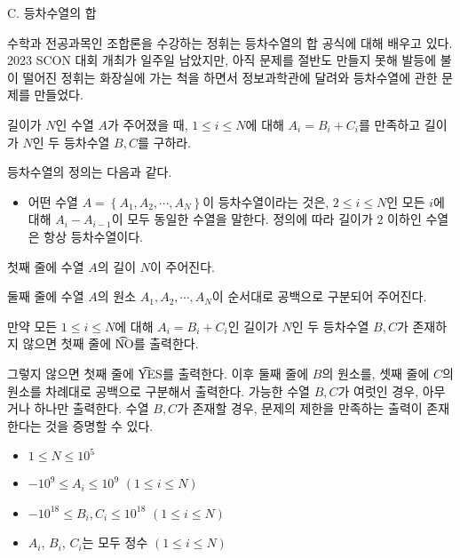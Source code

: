 \def\probtitle{등차수열의 합}
\def\probno{C}

\begin{problem}{\probno{}. \probtitle{}}

수학과 전공과목인 조합론을 수강하는 정휘는 등차수열의 합 공식에 대해 배우고 있다. 2023 SCON 대회 개최가 일주일 남았지만, 아직 문제를 절반도 만들지 못해 발등에 불이 떨어진 정휘는 화장실에 가는 척을 하면서 정보과학관에 달려와 등차수열에 관한 문제를 만들었다.

길이가 $N$인 수열 $A$가 주어졌을 때, $1 \le i \le N$에 대해 $A_i = B_i + C_i$를 만족하고 길이가 $N$인 두 등차수열 $B, C$를 구하라.

등차수열의 정의는 다음과 같다.
\begin{itemize}[noitemsep,topsep=0pt]
    \item 어떤 수열 $A = \left\{ A_1, A_2, \cdots, A_N \right\}$이 등차수열이라는 것은, $2 \leq i \leq N$인 모든 $i$에 대해 $A_i - A_{i-1}$이 모두 동일한 수열을 말한다. 정의에 따라 길이가 $2$ 이하인 수열은 항상 등차수열이다.
\end{itemize}

\InputFile

첫째 줄에 수열 $A$의 길이 $N$이 주어진다.

둘째 줄에 수열 $A$의 원소 $A_1, A_2, \cdots, A_N$이 순서대로 공백으로 구분되어 주어진다.

\OutputFile

만약 모든 $1 \leq i \leq N$에 대해 $A_i = B_i + C_i$인 길이가 $N$인 두 등차수열 $B, C$가 존재하지 않으면 첫째 줄에 \t{NO}를 출력한다.

그렇지 않으면 첫째 줄에 \t{YES}를 출력한다. 이후 둘째 줄에 $B$의 원소를, 셋째 줄에 $C$의 원소를 차례대로 공백으로 구분해서 출력한다. 가능한 수열 $B, C$가 여럿인 경우, 아무거나 하나만 출력한다. 수열 $B, C$가 존재할 경우, 문제의 제한을 만족하는 출력이 존재한다는 것을 증명할 수 있다.

\Constraints

\begin{itemize}[noitemsep]
    \item $1 \leq N \leq 10^5$
    \item $-10^9 \leq A_i \leq 10^9$ $(1 \le i \le N)$ 
    \item $-10^{18} \leq B_i, C_i \leq 10^{18}$ $(1 \le i \le N)$ 
    \item $A_i$, $B_i$, $C_i$는 모두 정수 $(1 \le i \le N)$
\end{itemize}

\Example

\begin{example}
\end{example}




\end{problem}